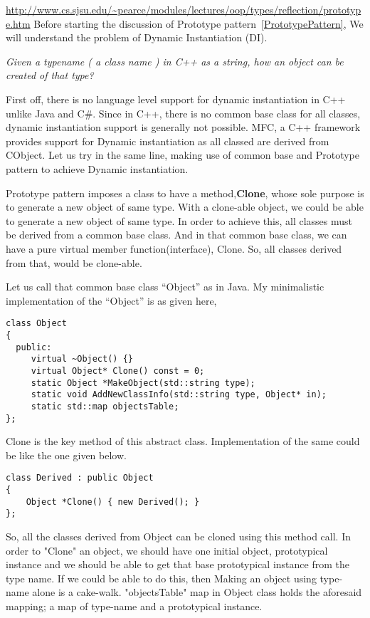 \documentclass{book}
\begin{document}
\url{http://www.cs.sjsu.edu/~pearce/modules/lectures/oop/types/reflection/prototype.htm}
Before starting the discussion of Prototype pattern~\ref{PrototypePattern}, We will understand the problem of Dynamic Instantiation (DI).

\textit{Given a typename ( a class name ) in C++ as a string, how an object can be created of that type?}

First off, there is no language level support for dynamic instantiation in C++ unlike Java and C\#.
Since in C++, there is no common base class for all classes, dynamic instantiation support is generally not possible.
MFC, a C++ framework provides support for Dynamic instantiation as all classed are derived from CObject.
Let us try in the same line, making use of common base and Prototype pattern to achieve Dynamic instantiation.

Prototype pattern imposes a class to have a method,\textbf{Clone}, whose sole purpose is to generate a new object of same type.
With a clone-able object, we could be able to generate a new object of same type.
In order to achieve this, all classes must be derived from a common base class. And in that common base class, we can have a pure virtual member function(interface), Clone.
So, all classes derived from that, would be clone-able.

Let us call that common base class ``Object'' as in Java. My minimalistic implementation of the ``Object'' is as given here,
\begin{verbatim}
class Object
{
  public:
     virtual ~Object() {}
     virtual Object* Clone() const = 0;
     static Object *MakeObject(std::string type);
     static void AddNewClassInfo(std::string type, Object* in);
     static std::map objectsTable;
};
\end{verbatim}

Clone is the key method of this abstract class. Implementation of the same could be like the one given below.

\begin{verbatim}
class Derived : public Object
{
    Object *Clone() { new Derived(); }
};
\end{verbatim}

So, all the classes derived from Object can be cloned using this method call.
In order to "Clone" an object, we should have one initial object, prototypical instance and we should be able to get that base prototypical instance from the type name.
If we could be able to do this, then Making an object using type-name alone is a cake-walk.
"objectsTable" map in Object class holds the aforesaid mapping; a map of type-name and a prototypical instance.
\end{document}
